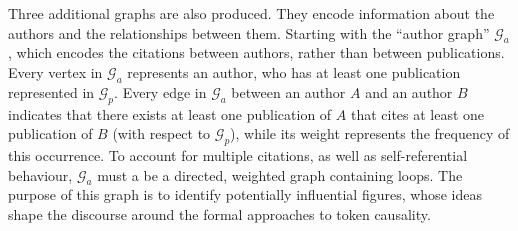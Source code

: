 \documentclass[11pt,a4paper]{book}
\theoremstyle{definition}
\theoremstyle{definition}
\theoremstyle{definition}
\theoremstyle{remark}
\newcommand{\pset}{S}
\newcommand{\xset}{\mathcal{S}}
\newcommand{\tgraph}{\mathcal{G}_{f}}
\newcommand{\pgraph}{\mathcal{G}_{p}}
\newcommand{\agraph}{\mathcal{G}_{a}}
\begin{document}
%


Three additional graphs are also produced. They encode information about the authors and the relationships between them. Starting with the ``author graph'' $\agraph$, which encodes the citations between authors, rather than between publications. Every vertex in $\agraph$ represents an author, who has at least one publication represented in $\pgraph$. Every edge in $\agraph$ between an author $A$ and an author $B$ indicates that there exists at least one publication of $A$ that cites at least one publication of $B$ (with respect to $\pgraph$), while its weight represents the frequency of this occurrence. To account for multiple citations, as well as self-referential behaviour, $\agraph$ must a be a directed, weighted graph containing loops. The purpose of this graph is to identify potentially influential figures, whose ideas shape the discourse around the formal approaches to token causality.
 
\end{document}
